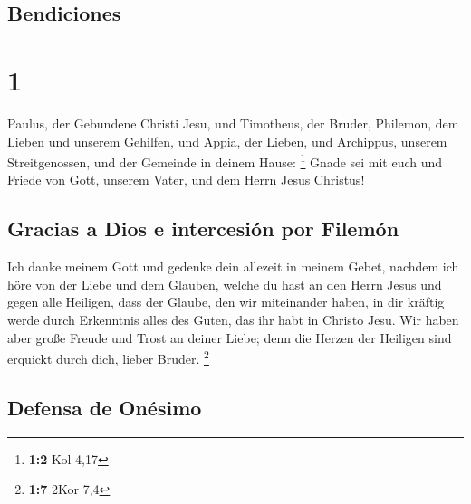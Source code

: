 \hypertarget{bendiciones}{%
\subsection{Bendiciones}\label{bendiciones}}

\hypertarget{section}{%
\section{1}\label{section}}

 Paulus, der Gebundene Christi Jesu, und Timotheus, der
Bruder, Philemon, dem Lieben und unserem Gehilfen,  und
Appia, der Lieben, und Archippus, unserem Streitgenossen, und der
Gemeinde in deinem Hause: \footnote{\textbf{1:2} Kol 4,17}
 Gnade sei mit euch und Friede von Gott, unserem Vater,
und dem Herrn Jesus Christus!

\hypertarget{gracias-a-dios-e-intercesiuxf3n-por-filemuxf3n}{%
\subsection{Gracias a Dios e intercesión por
Filemón}\label{gracias-a-dios-e-intercesiuxf3n-por-filemuxf3n}}

 Ich danke meinem Gott und gedenke dein allezeit in meinem
Gebet,  nachdem ich höre von der Liebe und dem Glauben,
welche du hast an den Herrn Jesus und gegen alle Heiligen,
 dass der Glaube, den wir miteinander haben, in dir
kräftig werde durch Erkenntnis alles des Guten, das ihr habt in Christo
Jesu.  Wir haben aber große Freude und Trost an deiner
Liebe; denn die Herzen der Heiligen sind erquickt durch dich, lieber
Bruder. \footnote{\textbf{1:7} 2Kor 7,4}

\hypertarget{defensa-de-onuxe9simo}{%
\subsection{Defensa de Onésimo}\label{defensa-de-onuxe9simo}}

